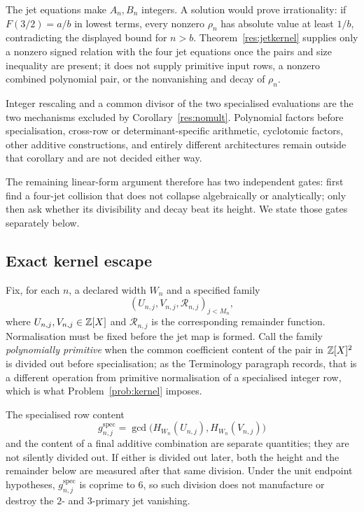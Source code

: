 \documentclass[11pt]{article}
\begin{document}
The jet equations make \(A_n,B_n\) integers.  A solution would prove
irrationality: if \(F(3/2)=a/b\) in lowest terms, every nonzero \(\rho_n\) has
absolute value at least \(1/b\), contradicting the displayed bound for
\(n>b\).  Theorem~\ref{res:jetkernel} supplies only a nonzero signed relation
with the four jet equations once the pairs and size inequality are present; it
does not supply primitive input rows, a nonzero combined polynomial pair, or
the nonvanishing and decay of \(\rho_n\).

Integer rescaling and a common divisor of the two specialised evaluations are
the two mechanisms excluded by Corollary~\ref{res:nomult}.  Polynomial factors
before specialisation, cross-row or determinant-specific arithmetic,
cyclotomic factors, other additive constructions, and entirely different
architectures remain outside that corollary and are not decided either way.

The remaining linear-form argument therefore has two
independent gates: first find a four-jet collision that does not collapse
algebraically or analytically; only then ask whether its divisibility and decay
beat its height.  We state those gates separately below.

\subsection{Exact kernel escape}

Fix, for each $n$, a declared width $W_n$ and a specified family
\[
 (U_{n,j},V_{n,j},\mathcal R_{n,j})_{j<M_n},
\]
where $U_{n,j},V_{n,j}\in\mathbb{Z}[X]$ and $\mathcal R_{n,j}$ is the corresponding
remainder function.  Normalisation must be fixed before the jet map is formed.
Call the family \emph{polynomially primitive} when the common coefficient
content of the pair in $\mathbb{Z}[X]^2$ is divided out before specialisation; as the
Terminology paragraph records, that is a different operation from primitive
normalisation of a specialised integer row, which is what
Problem~\ref{prob:kernel} imposes.

The specialised row content
\[
 g^{\mathrm{spec}}_{n,j}
 =\gcd\!\bigl(H_{W_n}(U_{n,j}),H_{W_n}(V_{n,j})\bigr)
\]
and the content of a final additive combination are separate quantities; they
are not silently divided out.  If either is divided out later, both the height
and the remainder below are measured after that same division.  Under the unit
endpoint hypotheses, $g^{\mathrm{spec}}_{n,j}$ is coprime to $6$, so such
division does not manufacture or destroy the $2$- and $3$-primary jet
vanishing.
\end{document}
